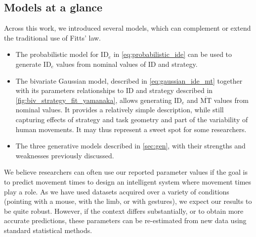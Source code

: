 \documentclass[acmlarge, manuscript,review]{acmart}
\newcommand{\mmt}{\ensuremath{\overline{\mt}}\xspace}
\newcommand{\mt}{\ensuremath{{\text{MT}}}\xspace}
\newcommand{\ide}{\ensuremath{{\text{ID}_e}}\xspace}
\begin{document}
\subsection{Models at a glance}
Across this work, we introduced several models, which can complement or extend the traditional use of Fitts' law.
\begin{itemize}
  \item The probabilistic model for \ide in \autoref{eq:probabilistic_ide} can be used to generate \ide values from nominal values of ID and strategy.
  \item The bivariate Gaussian model, described in \autoref{eq:gaussian_ide_mt} together with its parameters relationships to ID and strategy described in \autoref{fig:biv_strategy_fit_yamanaka}, allows generating \ide and \mmt values from nominal values. It provides a relatively simple description, while still capturing effects of strategy and task geometry and part of the variability of human movements. It may thus represent a sweet spot for some researchers.
  \item The three generative models described in \autoref{sec:gen}, with their strengths and weaknesses previously discussed.
\end{itemize}
We believe researchers can often use our reported parameter values if the goal is to predict movement times \eg to design an intelligent system where movement times play a role. As we have used datasets acquired over a variety of conditions (pointing with a mouse, with the limb, or with gestures), we expect our results to be quite robust. However, if the context differs substantially, or to obtain more accurate predictions, these parameters can be re-estimated from new data using standard statistical methods.
\end{document}
